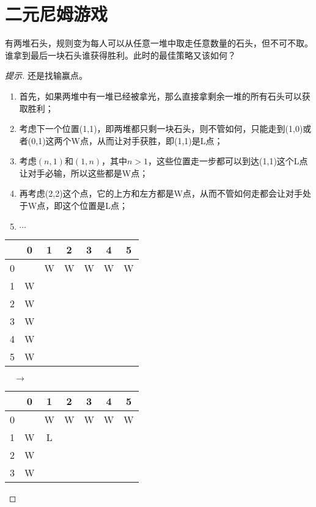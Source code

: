 \section{二元尼姆游戏}
\label{sec:two-piles-nim-game}

\begin{example}
  有两堆石头，规则变为每人可以从任意一堆中取走任意数量的石头，但不可不取。谁拿到最后一块石头谁获得胜利。此时的最佳策略又该如何？
\end{example}
\begin{proof}[提示]
  还是找输赢点。
  \begin{enumerate}
  \item 首先，如果两堆中有一堆已经被拿光，那么直接拿剩余一堆的所有石头可以获取胜利；
  \item 考虑下一个位置(1,1)，即两堆都只剩一块石头，则不管如何，只能走到(1,0)或者(0,1)这两个W点，从而让对手获胜，即(1,1)是L点；
  \item 考虑$(n,1)$和$(1,n)$，其中$n>1$，这些位置走一步都可以到达(1,1)这个L点让对手必输，所以这些都是W点；
  \item 再考虑(2,2)这个点，它的上方和左方都是W点，从而不管如何走都会让对手处于W点，即这个位置是L点；
  \item $\cdots$
  \end{enumerate}
  \begin{center}
    \begin{tabular}{|c|c|c|c|c|c|c|}
      \hline
        & 0 & 1 & 2 & 3 & 4 & 5\\\hline
      0 &   & W & W & W & W & W\\\hline
      1 & W &   &   &   &   &  \\\hline
      2 & W &   &   &   &   &  \\\hline
      3 & W &   &   &   &   &  \\\hline
      4 & W &   &   &   &   &  \\\hline
      5 & W &   &   &   &   &  \\\hline
    \end{tabular}
    $\quad\to\quad$
    \begin{tabular}{|c|c|c|c|c|c|c|}
      \hline
        & 0 & 1 & 2 & 3 & 4 & 5\\\hline
      0 &   & W & W & W & W & W\\\hline
      1 & W & \cellcolor{blue!20}L &   &   &   &  \\\hline
      2 & W &   &   &   &   &  \\\hline
      3 & W &   &   &   &   &  \\\hline

\end{tabular}
\end{center}
\end{proof}

